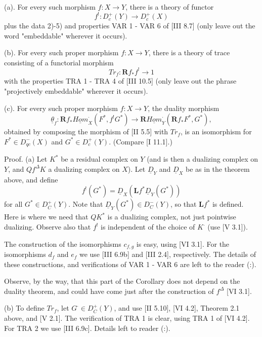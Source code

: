 \documentclass[12pt]{book}
\begin{document}
(a). For every such morphism \(f: X \to Y\), there is a theory of
functor
\[f^{!}: D_{c}^{+}(Y) \to D_{c}^{+}(X)\]
plus the data 2)-5) and properties VAR 1 - VAR 6 of [III 8.7] (only leave out the word "embeddable" wherever it occurs).

(b). For every such proper morphism \(f: X \to Y\), there is a theory of trace consisting of a functorial morphism
\[Tr_{f}: \mathbf{R} f_{*} f^{!} \to 1\]
with the properties TRA 1 - TRA 4 of [III 10.5] (only leave out the phrase "projectively embeddable" wherever it occurs).

\setcounter{page}{384}
(c). For every such proper morphism \(f: X \to Y\), the duality morphism
\[\underline{\theta}_{f}: \mathbf{R} f_{*} \underline{Hom}_{X}^{\cdot}\left(F^{*}, f^{!} G^{*}\right) \to \mathbf{R} \underline{Hom}_{Y}^{\cdot}\left(\mathbf{R} f_{*} F^{*}, G^{*}\right),\]
obtained by composing the morphism of [II 5.5] with \(Tr_{f}\), is an isomorphism for \(F^{*} \in D_{qc}^{-}(X)\) and \(G^{*} \in D_{c}^{+}(Y)\).
(Compare [I 11.1].)

Proof. (a)
Let \(K^{*}\) be a residual complex on \(Y\) (and is then a dualizing complex on \(Y\), and \(Q f^{\Delta} K\) a dualizing complex on \(X\)).
Let \(\underline{D}_{Y}\) and \(\underline{D}_{X}\) be as in the theorem above, and define
\[f^{!}\left(G^{*}\right)=\underline{D}_{X}\left(\mathbf{L} f^{*} \underline{D}_{Y}\left(G^{*}\right)\right)\]
for all \(G^{*} \in D_{C}^{+}(Y)\).
Note that \(\underline{D}_{Y}(G^{*}) \in D_{C}^{-}(Y)\), so that \(\mathbf{L} f^{*}\) is defined.
Here is where we need that \(QK^{*}\) is a dualizing complex, not just pointwise dualizing.
Observe also that \(f^{!}\) is independent of the choice of \(K^{\cdot}\) (use [V 3.1]).

The construction of the isomorphisms \(c_{f,g}\) is easy, using [VI 3.1].
For the isomorphisms \(d_{f}\) and \(e_{f}\) we use [III 6.9b] and [III 2.4], respectively.
The details of these constructions, and verifications of VAR 1 - VAR 6 are left to the reader (:).

Observe, by the way, that this part of the Corollary does not depend on the duality theorem, and could have come just after the construction of \(f^{\Delta}\) [VI 3.1].

\setcounter{page}{385}
(b) To define \(Tr_{f}\), let \(G^{\cdot} \in D_{C}^{+}(Y)\), and use [II 5.10],
[VI 4.2], Theorem 2.1 above, and [V 2.1].
The verification of TRA 1 is clear, using TRA 1 of [VI 4.2].
For TRA 2 we use [III 6.9c]. Details left to reader (:).
\end{document}
